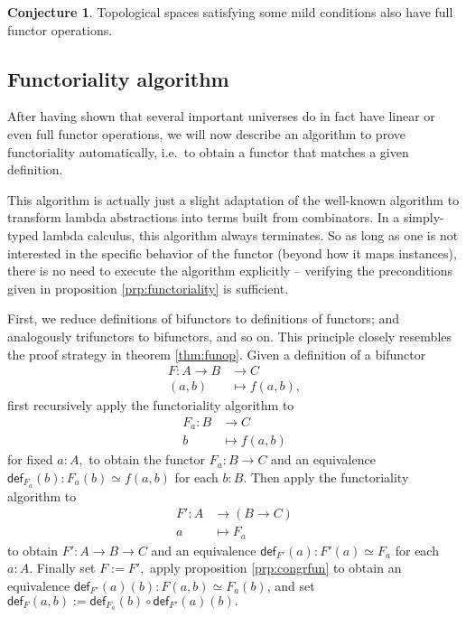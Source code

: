 \documentclass[a4paper]{article}
\theoremstyle{definition}
\newtheorem{conjecture}[definition]{Conjecture}
\theoremstyle{remark}
\renewcommand{\equiv}{\simeq}
\newcommand{\nm}{\mathsf}
\newcommand{\fndef}[1]{\nm{def}_{#1}}
\begin{document}
\begin{conjecture}
  Topological spaces satisfying some mild conditions also have full functor operations.
\end{conjecture}

\subsection{Functoriality algorithm}

After having shown that several important universes do in fact have linear or even full
functor operations, we will now describe an algorithm to prove functoriality
automatically, i.e.\ to obtain a functor that matches a given definition.

This algorithm is actually just a slight adaptation of the well-known algorithm to
transform lambda abstractions into terms built from combinators\cite{Combinators}. In a
simply-typed lambda calculus, this algorithm always terminates. So as long as one is
not interested in the specific behavior of the functor (beyond how it maps instances),
there is no need to execute the algorithm explicitly -- verifying the preconditions
given in proposition \ref{prp:functoriality} is sufficient.

First, we reduce definitions of bifunctors to definitions of functors; and analogously
trifunctors to bifunctors, and so on. This principle closely resembles the proof
strategy in theorem \ref{thm:funop}. Given a definition of a bifunctor
\begin{align*}
  F : A \to B &\to     C\\
      (a,b)   &\mapsto f(a,b),
\end{align*}
first recursively apply the functoriality algorithm to
\begin{align*}
  F_a : B &\to     C\\
        b &\mapsto f(a,b)
\end{align*}
for fixed $a : A,$ to obtain the functor $F_a : B \to C$ and an equivalence
$\fndef{F_a}(b) : F_a(b) \equiv f(a,b)$ for each $b : B.$ Then apply the
functoriality algorithm to
\begin{align*}
  F' : A &\to     (B \to C)\\
       a &\mapsto F_a
\end{align*}
to obtain $F' : A \to B \to C$ and an equivalence $\fndef{F'}(a) : F'(a) \equiv F_a$
for each $a : A.$
Finally set $F := F',$ apply proposition \ref{prp:congrfun} to obtain an equivalence
$\fndef{F'}(a)(b) : F(a,b) \equiv F_a(b)$, and set
$\fndef{F}(a,b) := \fndef{F_a}(b) \circ \fndef{F'}(a)(b).$
\end{document}

